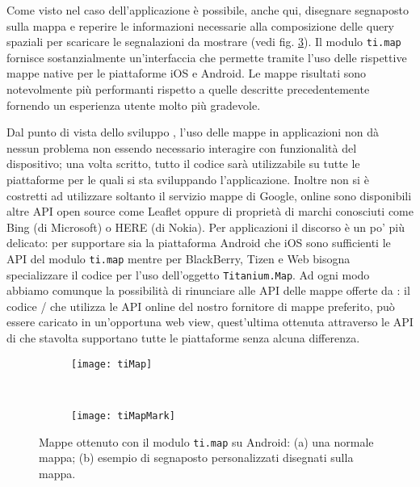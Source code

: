 			Come visto nel caso dell'applicazione \pg{} è possibile, anche qui,
			disegnare segnaposto sulla mappa e reperire le informazioni
			necessarie alla composizione delle query spaziali per scaricare le
			segnalazioni da mostrare (vedi fig. \ref{fig:TiMaps}). Il modulo
			\texttt{ti.map} fornisce sostanzialmente un'interfaccia che permette
			tramite \js{} l'uso	delle rispettive mappe native per le piattaforme
			iOS e Android. Le mappe risultati sono notevolmente più performanti
			rispetto a quelle descritte precedentemente fornendo un esperienza
			utente molto più gradevole.
			
			Dal punto di vista dello sviluppo \crossplat{}, l'uso delle mappe in
			applicazioni \pg{} non dà nessun problema non essendo necessario
			interagire con funzionalità del dispositivo; una volta scritto,
			tutto il codice sarà utilizzabile su tutte le piattaforme per le
			quali si sta sviluppando l'applicazione. Inoltre non si è
			costretti ad utilizzare soltanto il servizio mappe di Google, online
			sono disponibili altre API \js{} open source come Leaflet oppure
			di proprietà di marchi conosciuti come Bing (di Microsoft) o HERE
			(di Nokia). Per applicazioni \tisdk{} il discorso è un po' più
			delicato: per supportare sia la piattaforma Android che iOS sono
			sufficienti le API del modulo \texttt{ti.map} mentre per BlackBerry,
			Tizen e Web bisogna specializzare il codice per l'uso dell'oggetto
			\texttt{Titanium.Map}. Ad ogni modo abbiamo comunque la possibilità
			di rinunciare alle API delle mappe offerte da \tisdk{}: il codice
			\js{}/\html{} che utilizza le API online del nostro fornitore di
			mappe preferito, può essere caricato in un'opportuna web view,
			quest'ultima ottenuta attraverso le API di \tisdk{} che stavolta
			supportano tutte le piattaforme senza alcuna differenza.
			\begin{figure}[h]
				\centering
				\begin{subfigure}[b]{0.485\textwidth}
					\texttt{[image: tiMap]}
					\caption{}
					\label{fig:tiMap}
				\end{subfigure}
				~
				\begin{subfigure}[b]{0.485\textwidth}
					\texttt{[image: tiMapMark]}
					\caption{}
					\label{fig:tiMapMark}
				\end{subfigure}
				\caption{
					Mappe ottenuto con il modulo \texttt{ti.map} su Android: (a)
					una normale mappa; (b) esempio di segnaposto personalizzati
					disegnati sulla mappa.
				}
				\label{fig:TiMaps}
			\end{figure}
			
